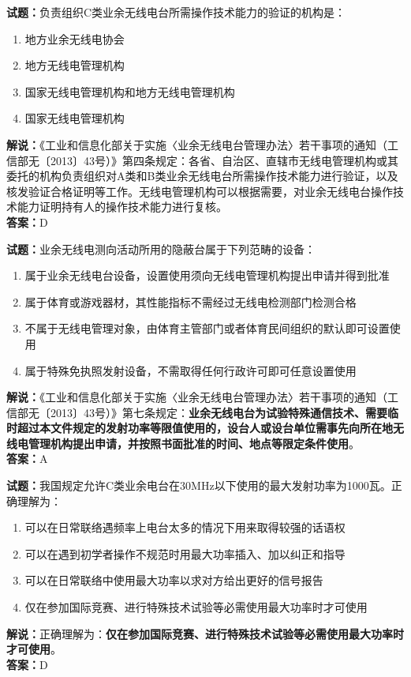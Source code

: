 \documentclass{ctexbook}
\begin{document}
\bigskip




\noindent\textbf{试题：}负责组织C类业余无线电台所需操作技术能力的验证的机构是：
\begin{enumerate}[leftmargin=3em]
\item 地方业余无线电协会
\item 地方无线电管理机构
\item 国家无线电管理机构和地方无线电管理机构
\item 国家无线电管理机构
\end{enumerate}
\noindent\textbf{解说：}《工业和信息化部关于实施〈业余无线电台管理办法〉若干事项的通知（工信部无〔2013〕43号）》第四条规定：各省、自治区、直辖市无线电管理机构或其委托的机构负责组织对A类和B类业余无线电台所需操作技术能力进行验证，以及核发验证合格证明等工作。无线电管理机构可以根据需要，对业余无线电台操作技术能力证明持有人的操作技术能力进行复核。\\\noindent\textbf{答案：}D

\bigskip




\noindent\textbf{试题：}业余无线电测向活动所用的隐蔽台属于下列范畴的设备：
\begin{enumerate}[leftmargin=3em]
\item 属于业余无线电台设备，设置使用须向无线电管理机构提出申请并得到批准
\item 属于体育或游戏器材，其性能指标不需经过无线电检测部门检测合格
\item 不属于无线电管理对象，由体育主管部门或者体育民间组织的默认即可设置使用
\item 属于特殊免执照发射设备，不需取得任何行政许可即可任意设置使用
\end{enumerate}
\noindent\textbf{解说：}《工业和信息化部关于实施〈业余无线电台管理办法〉若干事项的通知（工信部无〔2013〕43号）》第七条规定：\textbf{业余无线电台为试验特殊通信技术、需要临时超过本文件规定的发射功率等限值使用的，设台人或设台单位需事先向所在地无线电管理机构提出申请，并按照书面批准的时间、地点等限定条件使用}。\\\noindent\textbf{答案：}A

\bigskip




\noindent\textbf{试题：}我国规定允许C类业余电台在30\unit{\MHz}以下使用的最大发射功率为1000瓦。正确理解为：
\begin{enumerate}[leftmargin=3em]
\item 可以在日常联络遇频率上电台太多的情况下用来取得较强的话语权
\item 可以在遇到初学者操作不规范时用最大功率插入、加以纠正和指导
\item 可以在日常联络中使用最大功率以求对方给出更好的信号报告
\item 仅在参加国际竞赛、进行特殊技术试验等必需使用最大功率时才可使用
\end{enumerate}
\noindent\textbf{解说：}正确理解为：\textbf{仅在参加国际竞赛、进行特殊技术试验等必需使用最大功率时才可使用}。\\\noindent\textbf{答案：}D
\end{document}
